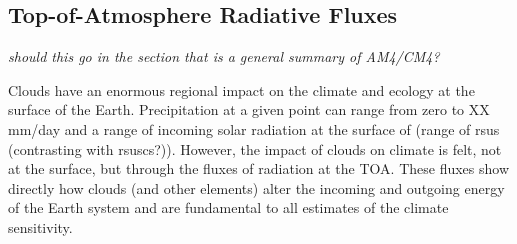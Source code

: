 \documentclass[draft]{agujournal2019}
\begin{document}
\subsection {Top-of-Atmosphere Radiative Fluxes}

\textit{should this go in the section that is a general summary of AM4/CM4?}

Clouds have an enormous regional impact on the climate and ecology at the surface of the Earth.   Precipitation 
at a given point can range from zero to XX mm/day and a range of incoming solar radiation at the surface of 
(range of rsus (contrasting with rsuscs?)).  However, the impact of clouds on climate is felt, not at the surface, 
but through the fluxes of radiation at the TOA.   These fluxes show directly how clouds (and other elements) alter
the incoming and outgoing energy of the Earth system and are fundamental to all estimates of the 
climate sensitivity.  
\end{document}
